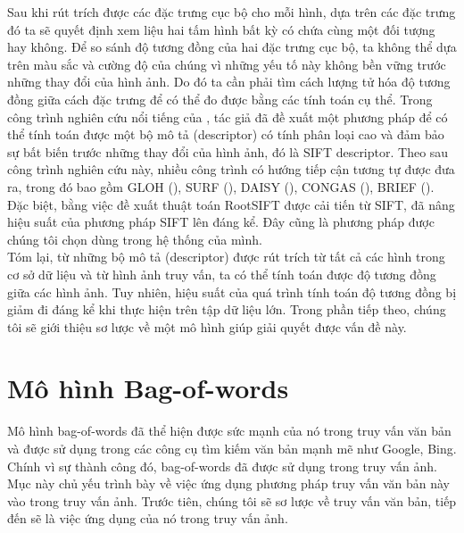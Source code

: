 Sau khi rút trích được các đặc trưng cục bộ cho mỗi hình, dựa trên các đặc trưng đó ta sẽ quyết định xem liệu hai tấm hình bất kỳ có chứa cùng một đối tượng hay không. Để so sánh độ tương đồng của hai đặc trưng cục bộ, ta không thể dựa trên màu sắc và cường độ của chúng vì những yếu tố này không bền vững trước những thay đổi của hình ảnh. Do đó ta cần phải tìm cách lượng tử hóa độ tương đồng giữa cách đặc trưng để có thể đo được bằng các tính toán cụ thể. Trong công trình nghiên cứu nổi tiếng của \cite{lowe2004distinctive}, tác giả đã đề xuất một phương pháp để có thể tính toán được một bộ mô tả (descriptor) có tính phân loại cao và đảm bảo sự bất biến trước những thay đổi của hình ảnh, đó là SIFT descriptor. Theo sau công trình nghiên cứu này, nhiều công trình có hướng tiếp cận tương tự được đưa ra, trong đó bao gồm GLOH (\cite{mikolajczyk2005performance}), SURF (\cite{bay2006surf}), DAISY (\cite{tola2008fast}), CONGAS (\cite{zheng2009tour}), BRIEF (\cite{calonder2010brief}). Đặc biệt, bằng việc đề xuất thuật toán RootSIFT được cải tiến từ SIFT, \cite{arandjelovic2012three} đã nâng hiệu suất của phương pháp SIFT lên đáng kể. Đây cũng là phương pháp được chúng tôi chọn dùng trong hệ thống của mình.\\
Tóm lại, từ những bộ mô tả (descriptor) được rút trích từ tất cả các hình trong cơ sở dữ liệu và từ hình ảnh truy vấn, ta có thể tính toán được độ tương đồng giữa các hình ảnh. Tuy nhiên, hiệu suất của quá trình tính toán độ tương đồng bị giảm đi đáng kể khi thực hiện trên tập dữ liệu lớn. Trong phần tiếp theo, chúng tôi sẽ giới thiệu sơ lược về một mô hình giúp giải quyết được vấn đề này.

\section{Mô hình Bag-of-words}
\label{bag-of-words}
Mô hình bag-of-words đã thể hiện được sức mạnh của nó trong truy vấn văn bản và được sử dụng trong các công cụ tìm kiếm văn bản mạnh mẽ như Google, Bing. Chính vì sự thành công đó, bag-of-words đã được sử dụng trong truy vấn ảnh. Mục này chủ yếu trình bày về việc ứng dụng phương pháp truy vấn văn bản này vào trong truy vấn ảnh. Trước tiên, chúng tôi sẽ sơ lược về truy vấn văn bản, tiếp đến sẽ là việc ứng dụng của nó trong truy vấn ảnh.

